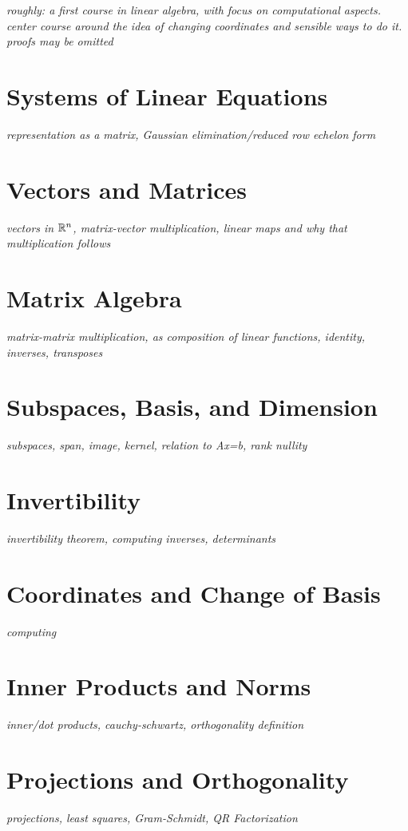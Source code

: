 \documentclass[../../../main.tex]{subfiles}
\begin{document}

\textit{roughly: a first course in linear algebra, with focus on computational aspects.
center course around the idea of changing coordinates and sensible ways to do it.
proofs may be omitted}

\section{Systems of Linear Equations}
\textit{representation as a matrix, Gaussian elimination/reduced row echelon form}
\section{Vectors and Matrices}
\textit{vectors in $\mathbb{R}^n$, matrix-vector multiplication, linear maps and why that multiplication follows}
\section{Matrix Algebra}
\textit{matrix-matrix multiplication, as composition of linear functions, identity, inverses, transposes}
\section{Subspaces, Basis, and Dimension}
\textit{subspaces, span, image, kernel, relation to Ax=b, rank nullity}
\section{Invertibility}
\textit{invertibility theorem, computing inverses, determinants}
\section{Coordinates and Change of Basis}
\textit{computing}
\section{Inner Products and Norms}
\textit{inner/dot products, cauchy-schwartz, orthogonality definition}
\section{Projections and Orthogonality}
\textit{projections, least squares, Gram-Schmidt, QR Factorization}
\end{document}
